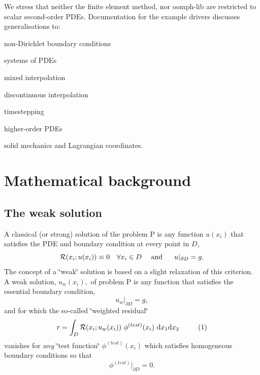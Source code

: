 We stress that neither the finite element method, nor {\ttfamily oomph-\/lib} are restricted to scalar second-\/order P\+D\+Es. Documentation for the example drivers discusses generalisations to\+:
\begin{DoxyItemize}
\item non-\/\+Dirichlet boundary conditions
\item systems of P\+D\+Es
\item mixed interpolation
\item discontinuous interpolation
\item timestepping
\item higher-\/order P\+D\+Es
\item solid mechanics and Lagrangian coordinates.
\end{DoxyItemize}



 

\hypertarget{index_mathFE}{}\section{Mathematical background}\label{index_mathFE}
\hypertarget{index_weaksoln}{}\subsection{The weak solution}\label{index_weaksoln}
A classical (or strong) solution of the problem P is any function $ u(x_i) $ that satisfies the P\+DE and boundary condition at every point in $ D$, \[ {\cal R}(x_i; u(x_i)) \equiv 0 \ \ \ \forall x_i \in D \mbox{\ \ \ \ and \ \ \ \ } u|_{\partial D} = g. \] The concept of a \char`\"{}weak\char`\"{} solution is based on a slight relaxation of this criterion. A weak solution, $u_w(x_i), $ of problem P is any function that satisfies the essential boundary condition, \[ u_w|_{\partial D} = g, \] and for which the so-\/called \char`\"{}weighted residual\char`\"{} \[ r = \int_{D} {\cal R}(x_i; u_w(x_i)) \ \phi^{(test)}(x_i) \ \mbox{d}x_1 \mbox{d}x_2 \ \ \ \ \ \ \ \ (1) \] vanishes for {\itshape any} \char`\"{}test function\char`\"{} $ \phi^{(test)}(x_i) $ which satisfies homogeneous boundary conditions so that \[ \phi^{(test)}|_{\partial D} = 0. \]

